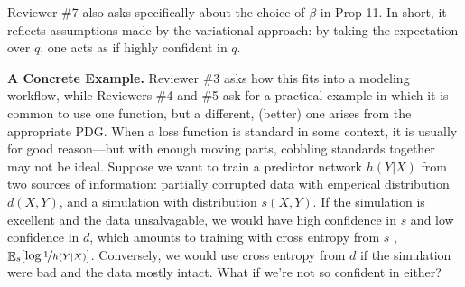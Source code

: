 \documentclass{article}
\theoremstyle{plain}
\theoremstyle{definition}
\DeclareMathOperator*{\Ex}{\mathbb{E}} %
\newcommand\revc[1]{{\color{revcolor}#1}}
\begin{document}
\revc{Reviewer \#7} also asks specifically about the choice of $\beta$ in Prop 11.
In short, it reflects assumptions made by the variational approach: by taking the expectation over $q$, one acts as if highly confident in $q$.

\textbf{A Concrete Example.}
\revc{Reviewer \#3} asks how this fits into a modeling workflow, while
\revc{Reviewers \#4 and \#5} ask for a practical example in which it is common to use one function, but a different, (better) one arises from the appropriate PDG.
When a loss function is standard in some context, it is usually for good reason---but with enough moving parts, cobbling standards together may not be ideal.
Suppose we want to train a predictor network $h(Y|X)$ from two sources of information: partially corrupted data with emperical distribution $d(X,Y)$, and a simulation with distribution $s(X,Y)$.
If the simulation is excellent and the data unsalvagable, we would have high confidence in $s$ and low confidence in $d$, which amounts to training with cross entropy from $s$%
, $\Ex_s [\log \nf1{h(Y|X)}]$.
Conversely, we would use cross entropy from $d$ if the simulation were bad and the data mostly intact.
What if we're not so confident in either?
\end{document}
